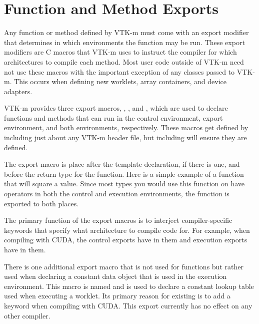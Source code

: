 

\section{Function and Method Exports}
\label{sec:FunctionAndMethodExports}

Any function or method defined by VTK-m must come with an export modifier
that determines in which environments the function may be run. These export
modifiers are C macros that VTK-m uses to instruct the compiler for which
architectures to compile each method. Most user code outside of VTK-m need
not use these macros with the important exception of any classes passed to
VTK-m. This occurs when defining new worklets, array containers, and device
adapters.

VTK-m provides three export macros, \vtkmcontexport, \vtkmexecexport, and
\vtkmexeccontexport, which are used to declare functions and methods that
can run in the control environment, export environment, and both
environments, respectively. These macros get defined by including just
about any VTK-m header file, but including  will
ensure they are defined. 

The export macro is place after the template declaration, if there is one,
and before the return type for the function. Here is a simple example of a
function that will square a value. Since most types you would use this
function on have operators in both the control and execution environments,
the function is exported to both places.


The primary function of the export macros is to interject compiler-specific
keywords that specify what architecture to compile code for. For example,
when compiling with CUDA, the control exports have
 in them and execution exports have
 in them.

There is one additional export macro that is not used for functions but
rather used when declaring a constant data object that is used in the
execution environment. This macro is named
and is used to declare a constant lookup table used when executing a
worklet. Its primary reason for existing is to add a
 keyword when compiling with CUDA. This export
currently has no effect on any other compiler.


